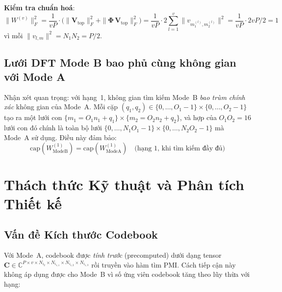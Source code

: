 \documentclass[11pt,a4paper]{article}
\begin{document}
\noindent\textbf{Kiểm tra chuẩn hoá}:
\begin{equation}
  \|W^{(v)}\|_F^2 = \frac{1}{v P} \cdot
  \bigl(\|\mathbf{V}_{\text{top}}\|_F^2 + \|\boldsymbol{\Phi}\,\mathbf{V}_{\text{top}}\|_F^2\bigr)
  = \frac{1}{vP} \cdot 2 \sum_{l=1}^{v} \|v_{m_1^{(l)},m_2^{(l)}}\|^2
  = \frac{1}{vP} \cdot 2vP/2 = 1
  \label{eq:norm_check}
\end{equation}
vì mỗi $\|v_{l,m}\|^2 = N_1 N_2 = P/2$.

\subsection{Lưới DFT Mode B bao phủ cùng không gian với Mode A}

Nhận xét quan trọng: với hạng~1, không gian tìm kiếm Mode~B
\emph{bao trùm chính xác} không gian của Mode~A.
Mỗi cặp $(q_1, q_2) \in \{0,\ldots,O_1{-}1\}\times\{0,\ldots,O_2{-}1\}$
tạo ra một lưới con $\{m_1 = O_1 n_1 + q_1\} \times \{m_2 = O_2 n_2 + q_2\}$,
và hợp của $O_1 O_2 = 16$ lưới con đó chính là toàn bộ lưới
$\{0,\ldots,N_1 O_1{-}1\} \times \{0,\ldots,N_2 O_2{-}1\}$ mà Mode~A sử dụng.
Điều này đảm bảo:
\begin{equation}
  \text{cap}(W^{(1)}_\text{ModeB}) = \text{cap}(W^{(1)}_\text{ModeA})
  \quad \text{(hạng 1, khi tìm kiếm đầy đủ)}
  \label{eq:equiv_rank1}
\end{equation}

\section{Thách thức Kỹ thuật và Phân tích Thiết kế}

\subsection{Vấn đề Kích thước Codebook}

Với Mode~A, codebook được \emph{tính trước} (precomputed) dưới dạng tensor
$\mathbf{C} \in \mathbb{C}^{P \times v \times N_{i_2} \times N_{i_{1,1}} \times N_{i_{1,2}} \times N_{i_{1,3}}}$
rồi truyền vào hàm tìm PMI. Cách tiếp cận này không áp dụng được cho Mode~B
vì số ứng viên codebook tăng theo lũy thừa với hạng:
\end{document}
